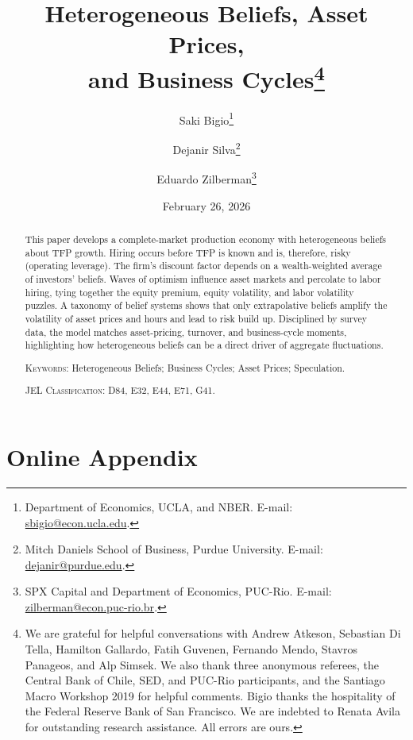 \documentclass[12pt,english]{article}
\title{\textbf{Heterogeneous Beliefs, Asset Prices, \\and Business Cycles}\thanks{We are grateful for helpful conversations with Andrew Atkeson, Sebastian Di Tella, Hamilton Gallardo, Fatih Guvenen, Fernando Mendo, Stavros Panageos, and Alp Simsek. We also thank three anonymous referees, the Central Bank of Chile, SED, and PUC-Rio participants, and the Santiago Macro Workshop 2019 for helpful comments. Bigio thanks the hospitality of the Federal Reserve Bank of San Francisco. We are indebted to Renata Avila for outstanding research assistance. All errors are ours.}
}
\author{ 
Saki Bigio\thanks{Department of Economics, UCLA, and NBER. E-mail: \href{sbigio@econ.ucla.edu}{sbigio@econ.ucla.edu}.} \and
Dejanir Silva\thanks{Mitch Daniels School of Business, Purdue University. E-mail: \href{dejanir@purdue.edu}{dejanir@purdue.edu}.}\and
Eduardo Zilberman\thanks{SPX Capital and Department of Economics, PUC-Rio. E-mail: \href{zilberman@econ.puc-rio.br}{zilberman@econ.puc-rio.br}.}}
\date{February 26, 2026}
\theoremstyle{definition}
\theoremstyle{plain}
\theoremstyle{plain}
\theoremstyle{plain}
\begin{document}
	\sloppy
	\maketitle
	\thispagestyle{empty}
	
\begin{abstract} 
	\noindent 
This paper develops a complete-market production economy with heterogeneous beliefs about TFP growth. 
Hiring occurs before TFP is known and is, therefore, risky (operating leverage). 
The firm's discount factor depends on a wealth-weighted average of investors' beliefs. 
Waves of optimism influence asset markets and percolate to labor hiring, tying together the equity premium, equity volatility, and labor volatility puzzles. 
A taxonomy of belief systems shows that only extrapolative beliefs amplify the volatility of asset prices and hours and lead to risk build up. 
Disciplined by survey data, the model matches asset-pricing, turnover, and business-cycle moments, highlighting how heterogeneous beliefs can be a direct driver of aggregate fluctuations.
	\vspace{10mm}	
	\bigskip
	
	\noindent	
	\textsc{Keywords}: Heterogeneous Beliefs; Business Cycles; Asset Prices; Speculation.
	
	\medskip
	\noindent
	\textsc{JEL Classification}: D84, E32, E44, E71, G41.		
\end{abstract}

\newpage

\setcounter{page}{1}

\onehalfspacing

\newpage















\singlespacing



\newpage
\appendix
\part*{Online Appendix}\label{appendix}
\setcounter{page}{1}
\onehalfspacing

\newpage


\end{document}
